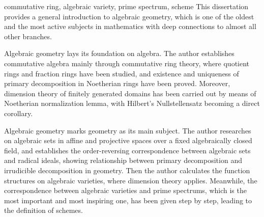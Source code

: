 

\begin{abstract}{交换幺环, 代数簇, 素谱, 概型}
  代数几何历史悠久而又充满活力, 与其它数学分支有着深刻的联系, 是一门重要的学科. 代数几何包含代数与几何, 可以认为是将代数理论应用到几何的研究之中.

  代数几何的理论根基在于代数. 本文从基本定义开始建立了以环论为主模论为辅的交换代数理论, 研究了商环与分式环的基本性质, 证明了Noether环上准素分解的存在性及其满足的唯一性, 以域论为基础利用Noether正规化引理证明了域的有限生成整环上的维数定理和Hilbert零点定理.

  代数几何的研究对象在于几何. 本文研究了固定代数闭域上的仿射与射影空间中的代数集, 建立了根式理想与代数集之间的对应, 从而将准素分解理论与几何相联系. 本文还讨论了代数簇上的函数结构, 以此将维数理论应用到几何中. 在此过程中, 本文逐步建立了代数簇与素谱之间的对应, 并最终引出了概型的定义.
\end{abstract}

\begin{abstract*}{commutative ring, algebraic variety, prime spectrum, scheme}
  This dissertation provides a general introduction to algebraic geometry, which is one of the oldest and the most active subjects in mathematics with deep connections to almost all other branches.

  Algebraic geometry lays its foundation on algebra. The author establishes commutative algebra mainly through commutative ring theory, where quotient rings and fraction rings have been studied, and existence and uniqueness of primary decomposition in Noetherian rings have been proved. Moreover, dimension theory of finitely generated domains has been carried out by means of Noetherian normalization lemma, with Hilbert's Nullstellensatz becoming a direct corollary.

  Algebraic geometry marks geometry as its main subject. The author researches on algebraic sets in affine and projective spaces over a fixed algebraically closed field, and establishes the order-reversing correspondence between algebraic sets and radical ideals, showing relationship between primary decomposition and irrudicible decomposition in geometry. Then the author calculates the function structures on algebraic varieties, where dimension theory applies. Meanwhile, the correspondence between algebraic varieties and prime spectrums, which is the most important and most inspiring one, has been given step by step, leading to the definition of schemes.
\end{abstract*}
